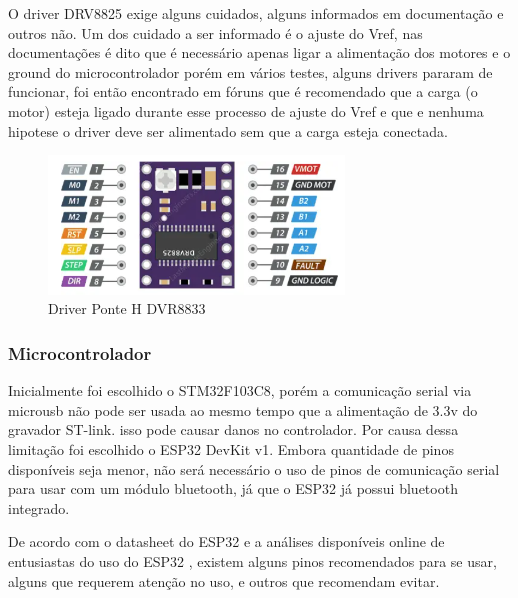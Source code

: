 O driver DRV8825 exige alguns cuidados, alguns informados em documentação e outros não.
Um dos cuidado a ser informado é o ajuste do Vref, nas documentações é dito que é necessário apenas ligar a alimentação dos motores e o ground do microcontrolador
porém em vários testes, alguns drivers pararam de funcionar,  foi então encontrado em fóruns que é recomendado que a carga (o motor) esteja ligado durante esse processo de ajuste do Vref
e que e nenhuma hipotese o driver deve ser alimentado sem que a carga esteja conectada.


\begin{figure}[htb]
	\centering
	\includegraphics[width=0.7\textwidth]{figures/DRV8825}
	\caption{Driver Ponte H DVR8833 \cite{DRV8833_image}}
\end{figure}


\subsubsection{Microcontrolador}

Inicialmente foi escolhido o STM32F103C8, porém a comunicação serial via microusb não pode ser usada ao mesmo tempo que
a alimentação de 3.3v do gravador ST-link. isso pode causar danos no controlador. Por causa dessa limitação foi escolhido o ESP32 DevKit v1.
Embora  quantidade de pinos disponíveis seja menor, não será necessário o uso de pinos de comunicação serial para usar com um módulo bluetooth,
já que o ESP32 já possui bluetooth integrado.

De acordo com o datasheet do ESP32 \cite{esp32_datasheet} e a análises disponíveis online de entusiastas do uso do ESP32 \cite{esp32_reference},
existem alguns pinos recomendados para se usar, alguns que requerem atenção no uso, e outros que recomendam evitar.

